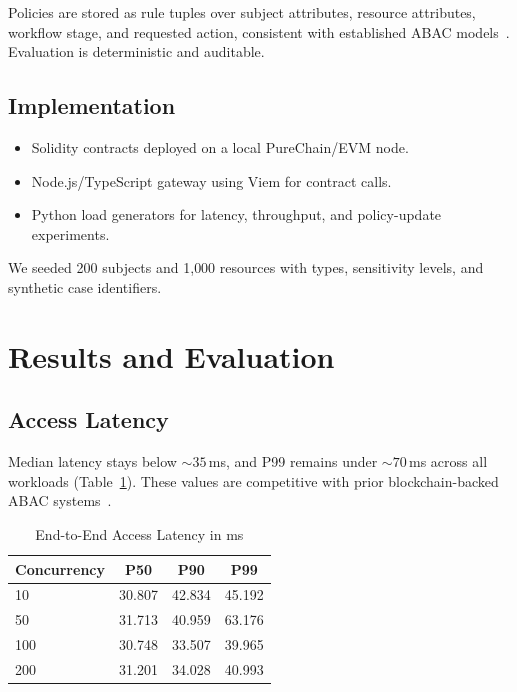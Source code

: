 \documentclass[conference]{IEEEtran}
\begin{document}
Policies are stored as rule tuples over subject attributes, resource attributes, workflow stage, and requested action, consistent with established ABAC models~\cite{hu_abac_nist}. Evaluation is deterministic and auditable.

\subsection{Implementation}

\begin{itemize}
    \item Solidity contracts deployed on a local PureChain/EVM node.
    \item Node.js/TypeScript gateway using Viem for contract calls.
    \item Python load generators for latency, throughput, and policy-update experiments.
\end{itemize}

We seeded 200 subjects and 1{,}000 resources with types, sensitivity levels, and synthetic case identifiers.

\section{Results and Evaluation}

\subsection{Access Latency}

Median latency stays below ${\sim}35$\,ms, and P99 remains under ${\sim}70$\,ms across all workloads (Table~\ref{tab:latency}). These values are competitive with prior blockchain-backed ABAC systems~\cite{abac_blockchain_survey, medrec}.

\begin{table}[t]
\centering
\caption{End-to-End Access Latency in ms}
\label{tab:latency}
\begin{tabular}{lccc}
\toprule
\textbf{Concurrency} & \textbf{P50} & \textbf{P90} & \textbf{P99} \\
\midrule
10   & 30.807  & 42.834 & 45.192 \\
50   & 31.713 & 40.959 & 63.176 \\
100  & 30.748 & 33.507 & 39.965 \\
200  & 31.201 & 34.028 & 40.993 \\
\bottomrule
\end{tabular}
\end{table}
\end{document}
